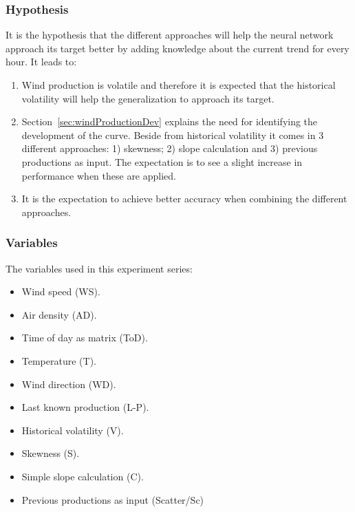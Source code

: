 \subsubsection{Hypothesis} 
It is the hypothesis that the different approaches will help the neural network approach its target better by adding knowledge about the current trend for every hour. It leads to: 

\begin{enumerate}
\item Wind production is volatile and therefore it is expected that the historical volatility will help the generalization to approach its target.
\item Section~\ref{sec:windProductionDev} explains the need for identifying the development of the curve. Beside from historical volatility it comes in 3 different approaches: 1) skewness; 2) slope calculation and 3) previous productions as input. The expectation is to see a slight increase in performance when these are applied.
\item It is the expectation to achieve better accuracy when combining the different approaches.
\end{enumerate}

\subsubsection{Variables}
The variables used in this experiment series:

\begin{itemize}
\item Wind speed (WS).
\item Air density (AD).
\item Time of day as matrix (ToD).
\item Temperature (T).
\item Wind direction (WD).
\item Last known production (L-P).
\item Historical volatility (V).
\item Skewness (S).
\item Simple slope calculation (C).
\item Previous productions as input (Scatter/Sc)
\end{itemize}

